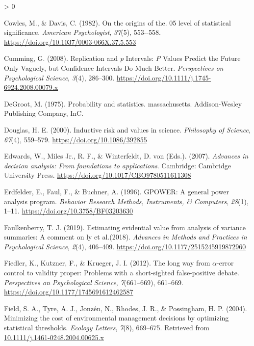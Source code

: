 \documentclass[
  english,
  ,man, a4paper,floatsintext]{apa6}
\newlength{\cslhangindent}
\newenvironment{CSLReferences}[2] %
 {%
  \setlength{\parindent}{0pt}
  \ifodd #1 \everypar{\setlength{\hangindent}{\cslhangindent}}\ignorespaces\fi
  \ifnum #2 > 0
  \setlength{\parskip}{#2\baselineskip}
  \fi
 }%
 {}
\begin{document}
\begin{CSLReferences}{1}{0}
\leavevmode\hypertarget{ref-cowles_origins_1982}{}%
Cowles, M., \& Davis, C. (1982). On the origins of the. 05 level of statistical significance. \emph{American Psychologist}, \emph{37}(5), 553-\/-558. \url{https://doi.org/10.1037/0003-066X.37.5.553}

\leavevmode\hypertarget{ref-cumming_replication_2008}{}%
Cumming, G. (2008). Replication and {\emph{p}} {Intervals}: {\emph{P}} {Values Predict} the {Future Only Vaguely}, but {Confidence Intervals Do Much Better}. \emph{Perspectives on Psychological Science}, \emph{3}(4), 286--300. \url{https://doi.org/10.1111/j.1745-6924.2008.00079.x}

\leavevmode\hypertarget{ref-degroot1975probability}{}%
DeGroot, M. (1975). Probability and statistics. massachusetts. Addison-Wesley Publishing Company, InC.

\leavevmode\hypertarget{ref-douglas_inductive_2000}{}%
Douglas, H. E. (2000). Inductive risk and values in science. \emph{Philosophy of Science}, \emph{67}(4), 559--579. \url{https://doi.org/10.1086/392855}

\leavevmode\hypertarget{ref-edwards_advances_2007}{}%
Edwards, W., Miles Jr., R. F., \& Winterfeldt, D. von (Eds.). (2007). \emph{Advances in decision analysis: {From} foundations to applications}. Cambridge: Cambridge University Press. \url{https://doi.org/10.1017/CBO9780511611308}

\leavevmode\hypertarget{ref-erdfelder_gpower_1996}{}%
Erdfelder, E., Faul, F., \& Buchner, A. (1996). {GPOWER}: {A} general power analysis program. \emph{Behavior Research Methods, Instruments, \& Computers}, \emph{28}(1), 1--11. \url{https://doi.org/10.3758/BF03203630}

\leavevmode\hypertarget{ref-faulkenberry2019estimating}{}%
Faulkenberry, T. J. (2019). Estimating evidential value from analysis of variance summaries: A comment on ly et al.(2018). \emph{Advances in Methods and Practices in Psychological Science}, \emph{2}(4), 406--409. \url{https://doi.org/10.1177/2515245919872960}

\leavevmode\hypertarget{ref-fiedler_long_2012}{}%
Fiedler, K., Kutzner, F., \& Krueger, J. I. (2012). The long way from {\(\alpha\)}-error control to validity proper: {Problems with} a short-sighted false-positive debate. \emph{Perspectives on Psychological Science}, \emph{7}(661--669), 661--669. \url{https://doi.org/10.1177/1745691612462587}

\leavevmode\hypertarget{ref-field_minimizing_2004}{}%
Field, S. A., Tyre, A. J., Jonzén, N., Rhodes, J. R., \& Possingham, H. P. (2004). Minimizing the cost of environmental management decisions by optimizing statistical thresholds. \emph{Ecology Letters}, \emph{7}(8), 669--675. Retrieved from \href{https://10.1111/j.1461-0248.2004.00625.x}{10.1111/j.1461-0248.2004.00625.x}


\end{CSLReferences}
\end{document}
